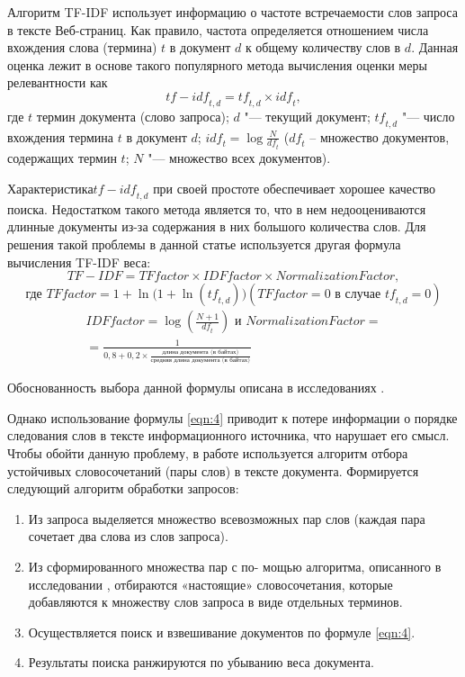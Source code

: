 Алгоритм TF-IDF использует информацию о частоте встречаемости слов запроса в тексте Веб-страниц. Как правило, частота определяется отношением числа вхождения слова (термина) \(t\) в документ \(d\) к общему количеству слов в \(d\). Данная оценка лежит в основе такого популярного метода вычисления оценки меры релевантности как
\begin{equation}
	\label{eqn:3}
	\textit{tf} - \textit{idf}_{t, d} = \textit{tf}_{t, d} \times \textit{idf}_t ,
\end{equation} 
где \(t\) термин документа (слово запроса); \(d\) "--- текущий документ; \(\textit{tf}_{t, d}\) "--- число вхождения термина \(t\) в документ \(d\); \( \textit{idf}_t = \log{\frac{N}{ \textit{df}_t}}\) (\( \textit{df}_t\) – множество документов, содержащих термин \(t\); \(N\) "--- множество всех документов).

Характеристика\(\textit{tf} - \textit{idf}_{t, d}\) при своей простоте обеспечивает хорошее качество поиска. Недостатком такого метода является то, что в нем недооцениваются длинные документы из-за содержания в них большого количества слов. Для решения такой проблемы в данной статье используется другая формула вычисления TF-IDF веса:
\begin{equation}
	\label{eqn:4}
	\textit{TF} - \textit{IDF} = \textit{TFfactor} \times \textit{IDFfactor} \times \textit{NormalizationFactor},
\end{equation}
\[
\text{где } \textit{TFfactor} = 1 + \ln{(1 + \ln(\textit{tf}_{t, d})}) (\textit{TFfactor} = 0 \text{ в случае } \textit{tf}_{t, d} = 0)
\]
\begin{multline}
	\textit{IDFfactor} = \log{(\frac{N + 1}{\textit{df}_t})} \text{ и } \textit{NormalizationFactor} = \\
	=  \frac{1}{0,8 + 0,2 \times \frac{\textit{длина документа (в байтах)}}{\textit{средняя длина документа (в байтах)}}}
\end{multline}

Обоснованность выбора данной формулы описана в исследованиях \cite{SinghalKaszkiel}.

Однако использование формулы \cref{eqn:4} приводит к потере информации о порядке следования слов в тексте информационного источника, что нарушает его смысл. Чтобы обойти данную проблему, в работе используется алгоритм отбора устойчивых словосочетаний (пары слов) \cite{Gubin} в тексте документа. Формируется следующий алгоритм обработки запросов:
\begin{enumerate}
	\item Из запроса выделяется множество всевозможных пар слов (каждая пара сочетает два слова из слов запроса).
	\item Из сформированного множества пар с по- мощью алгоритма, описанного в исследовании \cite{Gubin}, отбираются «настоящие» словосочетания, которые добавляются к множеству слов запроса в виде отдельных терминов.
	\item Осуществляется поиск и взвешивание документов по формуле \cref{eqn:4}.
	\item Результаты поиска ранжируются по убыванию веса документа.
\end{enumerate}

